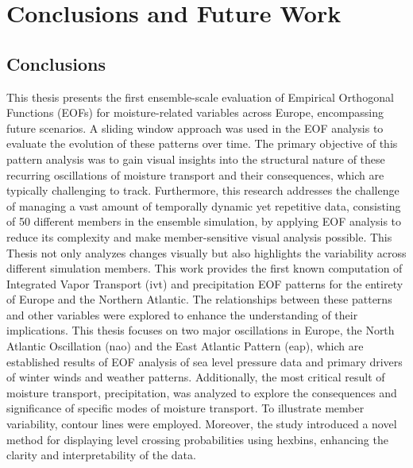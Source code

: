 \chapter{Conclusions and Future Work}
\label{ch:conclusions}

\section{Conclusions}
\label{sec:conclusions}


This thesis presents the first ensemble-scale evaluation of Empirical Orthogonal Functions (EOFs) for moisture-related variables across Europe, encompassing future scenarios. A sliding window approach was used in the EOF analysis to evaluate the evolution of these patterns over time. The primary objective of this pattern analysis was to gain visual insights into the structural nature of these recurring oscillations of moisture transport and their consequences, which are typically challenging to track.
Furthermore, this research addresses the challenge of managing a vast amount of temporally dynamic yet repetitive data, consisting of 50 different members in the ensemble simulation, by applying EOF analysis to reduce its complexity and make member-sensitive visual analysis possible. This Thesis not only analyzes changes visually but also highlights the variability across different simulation members.
This work provides the first known computation of Integrated Vapor Transport (\ac{ivt}) and precipitation EOF patterns for the entirety of Europe and the Northern Atlantic. The relationships between these patterns and other variables were explored to enhance the understanding of their implications. This thesis focuses on two major oscillations in Europe, the North Atlantic Oscillation (\ac{nao}) and the East Atlantic Pattern (\ac{eap}), which are established results of EOF analysis of sea level pressure data and primary drivers of winter winds and weather patterns.
Additionally, the most critical result of moisture transport, precipitation, was analyzed to explore the consequences and significance of specific modes of moisture transport. To illustrate member variability, contour lines were employed. Moreover, the study introduced a novel method for displaying level crossing probabilities using hexbins, enhancing the clarity and interpretability of the data. 
%
